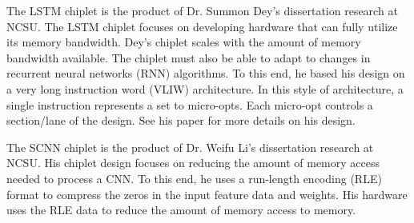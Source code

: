 \documentclass[../main.tex]{subfiles}
\begin{document}
The LSTM chiplet is the product of Dr. Summon Dey's dissertation research at NCSU\cite{Summon-Dey-LSTM}. The LSTM chiplet focuses on developing hardware that can fully utilize its memory bandwidth. Dey's chiplet scales with the amount of memory bandwidth available. The chiplet must also be able to adapt to changes in recurrent neural networks (RNN) algorithms. To this end, he based his design on a very long instruction word (VLIW) architecture. In this style of architecture, a single instruction represents a set to micro-opts. Each micro-opt controls a section/lane of the design. See his paper for more details on his design\cite{Summon-Dey-LSTM}.

The SCNN chiplet is the product of Dr. Weifu Li's dissertation research at NCSU\cite{LeWeifuDissertation}. His chiplet design focuses on reducing the amount of memory access needed to process a CNN. To this end, he uses a run-length encoding (RLE) format to compress the zeros in the input feature data and weights. His hardware uses the RLE data to reduce the amount of memory access to memory.
\end{document}
